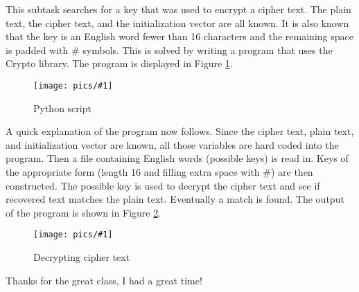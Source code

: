 \documentclass[11pt]{article}
\newcommand{\fig}[2]{ 
\begin{figure}[h]
	\centering
	\caption{#2}
	\texttt{[image: pics/\#1]}
	\label{fig:#1}
\end{figure} 
}
\begin{document}
This subtask searches for a key that was used to encrypt a cipher text. The plain text, the cipher text, and the initialization vector are all known. It is also known that the key is an English word fewer than 16 characters and the remaining space is padded with \# symbols. This is solved by writing a program that uses the Crypto library. The program is displayed in Figure \ref{fig:task4.2.1}.

\fig{task4.2.1}{Python script}

A quick explanation of the program now follows. Since the cipher text, plain text, and initialization vector are known, all those variables are hard coded into the program. Then a file containing English words (possible keys) is read in. Keys of the appropriate form (length 16 and filling extra space with \#) are then constructed. The possible key is used to decrypt the cipher text and see if recovered text matches the plain text. Eventually a match is found. The output of the program is shown in Figure \ref{fig:task4.2.2}.

\fig{task4.2.2}{Decrypting cipher text}

Thanks for the great class, I had a great time!
\end{document}
